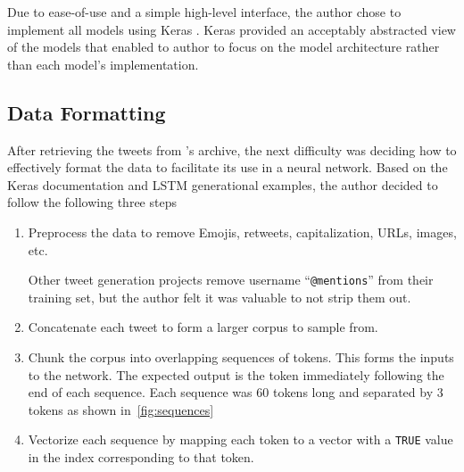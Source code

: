 \documentclass[letterpaper]{article}
\begin{document}
        Due to ease-of-use and a simple high-level interface, the author chose to implement all models using Keras \citep{chollet2015keras}. Keras provided an acceptably abstracted view of the models that enabled to author to focus on the model architecture rather than each model's implementation.

    \subsection{Data Formatting}
        After retrieving the tweets from \citet{brown_2017}'s archive, the next difficulty was deciding how to effectively format the data to facilitate its use in a neural network. Based on the Keras documentation and LSTM generational examples, the author decided to follow the following three steps

        \begin{enumerate}
            \item Preprocess the data to remove Emojis, retweets, capitalization, URLs, images, etc.

            Other tweet generation projects remove username ``\texttt{@mentions}'' from their training set, but the author felt it was valuable to not strip them out.

            \item Concatenate each tweet to form a larger corpus to sample from.
            \item Chunk the corpus into overlapping sequences of tokens. This forms the inputs to the network. The expected output is the token immediately following the end of each sequence. Each sequence was 60 tokens long and separated by 3 tokens as shown in~\autoref{fig:sequences}
            \item Vectorize each sequence by mapping each token to a vector with a \texttt{TRUE} value in the index corresponding to that token.
        \end{enumerate}
\end{document}
